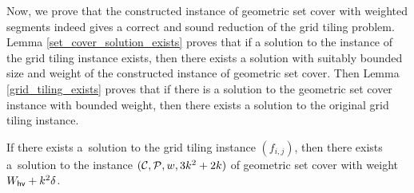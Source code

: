 Now, we prove that the constructed instance of geometric set cover
with weighted segments indeed gives a correct and sound reduction
of the grid tiling problem. Lemma \ref{set_cover_solution_exists}
proves that if a solution to the instance of the grid tiling instance exists,
then there exists a solution with suitably bounded size and weight
of the constructed instance of geometric set cover.
Then Lemma \ref{grid_tiling_exists} proves that if
there is a solution to the geometric set cover instance with bounded weight,
then there exists a solution to the original grid tiling instance.

\begin{lemma}
\label{set_cover_solution_exists}
	If there exists a~solution to the grid tiling instance $(f_{i,j})$,
	then there exists a~solution to the instance $(\mathcal{C}, \mathcal{P}, w, 3k^2+2k)$
	of geometric set cover with weight $W_{\mathsf{hv}}+k^2\delta$.
\end{lemma}

